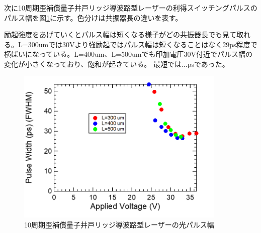 {次に10周期歪補償量子井戸リッジ導波路型レーザーの利得スイッチングパルスのパルス幅を図\ref{fig:fig_3_2_10QW_ridge_GS_FWHM}に示す。色分けは共振器長の違いを表す。


励起強度をあげていくとパルス幅は短くなる様子がどの共振器長でも見て取れる。L=300umでは30Vより強励起ではパルス幅は短くなることはなく29ps程度で横ばいになっている。L=400um、L=500umでも印加電圧30V付近でパルス幅の変化が小さくなっており、飽和が起きている。
最短では...psであった。
\begin{figure}[h]
	\centering
	\includegraphics[width=10cm]{figure/fig_3_2_10QW_ridge_GS_FWHM.png}
		\caption{10周期歪補償量子井戸リッジ導波路型レーザーの光パルス幅}
		\label{fig:fig_3_2_10QW_ridge_GS_FWHM}
\end{figure}


\clearpage　
}
